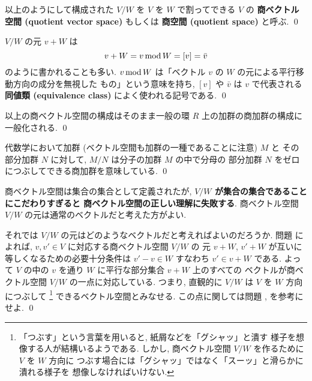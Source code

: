 \documentclass[12pt,twoside]{jarticle}
\begin{document}

\begin{definition}[商ベクトル空間]
  以上のようにして構成された $V/W$ を $V$ を $W$ で割ってできる $V$ の
  {\bf 商ベクトル空間 (quotient vector space)} もしくは
  {\bf 商空間 (quotient space)} と呼ぶ.
  \qed
\end{definition}

\begin{guide}[商ベクトル空間の元の記号について]
  $V/W$ の元 $v+W$ は 
  \begin{equation*}
    v+W = v\mathop{\mathrm{mod}}\nolimits W = [v] = \bar v
  \end{equation*}
  のように書かれることも多い.
  $v\mathop{\mathrm{mod}}\nolimits W$ は「ベクトル $v$ の $W$ の元による平行移動方向の成分を無視した
  もの」という意味を持ち, $[v]$ や $\bar v$ は $v$ で代表される{\bf 同値類 
  (equivalence class)} によく使われる記号である.
  \qed
\end{guide}


\begin{guide}
  以上の商ベクトル空間の構成はそのまま一般の環 $R$ 上の加群の商加群の構成に
  一般化される. \qed
\end{guide}


\begin{guide}[$M/N$ という記号法について]
  代数学において加群 (ベクトル空間も加群の一種であることに注意) $M$ と
  その部分加群 $N$ に対して, $M/N$ は分子の加群 $M$ の中で分母の
  部分加群 $N$ をゼロにつぶしてできる商加群を意味している.
  \qed
\end{guide}


\begin{rem}
  商ベクトル空間は集合の集合として定義されたが,
  {\bf $V/W$ が集合の集合であることにこだわりすぎると
  商ベクトル空間の正しい理解に失敗する}.
  商ベクトル空間 $V/W$ の元は通常のベクトルだと考えた方がよい.

  それでは $V/W$ の元はどのようなベクトルだと考えればよいのだろうか.
  問題  によれば, $v,v'\in V$ に対応する商ベクトル空間 $V/W$ の
  元 $v+W$, $v'+W$ が互いに等しくなるための必要十分条件は $v'-v\in W$ 
  すなわち $v'\in v+W$ である.
  よって $V$ の中の $v$ を通り $W$ に平行な部分集合 $v+W$ 上のすべての
  ベクトルが商ベクトル空間 $V/W$ の一点に対応している.
  つまり, 直観的に $V/W$ は $V$ を $W$ 方向につぶして%
  \footnote{「つぶす」という言葉を用いると, 紙屑などを「グシャッ」と潰す
    様子を想像する人が結構いるようである.  
    しかし, 商ベクトル空間 $V/W$ を作るために $V$ を $W$ 方向に
    つぶす場合には「グシャッ」ではなく「スーッ」と滑らかに潰れる様子を
    想像しなければいけない.}%
  できるベクトル空間とみなせる.  
  この点に関しては問題 ,  を参考にせよ.
  \qed
\end{rem}
\end{document}
